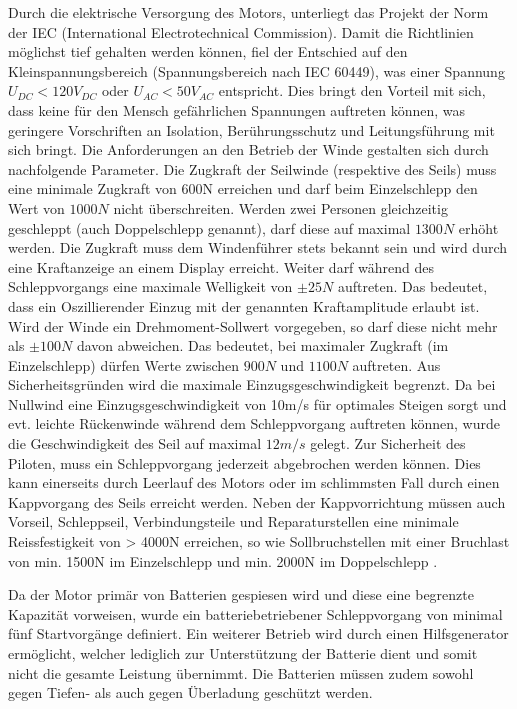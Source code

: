 Durch die elektrische Versorgung des Motors, unterliegt das Projekt der Norm der IEC (International Electrotechnical Commission). Damit die Richtlinien möglichst tief gehalten werden können, fiel der Entschied auf den Kleinspannungsbereich (Spannungsbereich  nach IEC 60449), was einer Spannung $U_{DC}<120V_{DC}$ oder $U_{AC}<50V_{AC}$ entspricht. Dies bringt den Vorteil mit sich, dass keine für den Mensch gefährlichen Spannungen auftreten können, was geringere Vorschriften an Isolation, Berührungsschutz und Leitungsführung mit sich bringt.
Die Anforderungen an den Betrieb der Winde gestalten sich durch nachfolgende Parameter. Die Zugkraft der Seilwinde (respektive des Seils) muss eine minimale Zugkraft von 600N erreichen und darf beim Einzelschlepp den Wert von $ 1000N $ nicht überschreiten. Werden zwei Personen gleichzeitig geschleppt (auch Doppelschlepp genannt), darf diese auf maximal $ 1300N $ erhöht werden. Die Zugkraft muss dem Windenführer stets bekannt sein und wird durch eine Kraftanzeige an einem Display erreicht.
Weiter darf während des Schleppvorgangs eine maximale Welligkeit von $\pm 25N$ auftreten. Das bedeutet, dass ein Oszillierender Einzug mit der genannten Kraftamplitude erlaubt ist. Wird der Winde ein Drehmoment-Sollwert vorgegeben, so darf diese nicht mehr als $\pm 100N$ davon abweichen. Das bedeutet, bei maximaler Zugkraft (im Einzelschlepp) dürfen Werte zwischen $ 900N $ und $ 1100N $ auftreten. Aus Sicherheitsgründen wird die maximale Einzugsgeschwindigkeit begrenzt. Da bei Nullwind eine Einzugsgeschwindigkeit von 10m/s für optimales Steigen sorgt und evt. leichte Rückenwinde während dem Schleppvorgang auftreten können, wurde die Geschwindigkeit des Seil auf maximal $ 12m/s $ gelegt.
Zur Sicherheit des Piloten, muss ein Schleppvorgang jederzeit abgebrochen werden können. Dies kann einerseits durch Leerlauf des Motors oder im schlimmsten Fall durch einen Kappvorgang des Seils erreicht werden. Neben der Kappvorrichtung müssen auch Vorseil, Schleppseil, Verbindungsteile und Reparaturstellen eine minimale Reissfestigkeit von > 4000N erreichen, so wie Sollbruchstellen mit einer Bruchlast von min. 1500N im Einzelschlepp und min. 2000N im Doppelschlepp \cite{WindenPruefanweisung}.


Da der Motor primär von Batterien gespiesen wird und diese eine begrenzte Kapazität vorweisen, wurde ein batteriebetriebener Schleppvorgang von minimal fünf Startvorgänge definiert. Ein weiterer Betrieb wird durch einen Hilfsgenerator ermöglicht, welcher lediglich zur Unterstützung der Batterie dient und somit nicht die gesamte Leistung übernimmt. Die Batterien müssen zudem sowohl gegen Tiefen- als auch gegen Überladung geschützt werden.